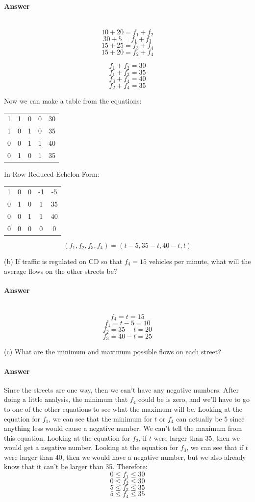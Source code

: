 \documentclass{article}
\newcommand{\p}[1]{\paragraph{#1}} %
\begin{document}
\p{Answer} \mbox{} \\
\[ 10 + 20 = f_1 + f_2 \]
\[ 30 + 5 = f_1 + f_3 \]
\[ 15 + 25 = f_3 + f_4 \]
\[ 15 + 20 = f_2 + f_4 \]

\[ f_1 + f_2 = 30 \]
\[ f_1 + f_3 = 35 \]
\[ f_3 + f_4 = 40 \]
\[ f_2 + f_4 = 35 \]

Now we can make a table from the equations:

\begin{center}
\begin{tabular}{ c c c c | c }
	1 & 1 & 0 & 0 & 30 \\
	1 & 0 & 1 & 0 & 35 \\
	0 & 0 & 1 & 1 & 40 \\
	0 & 1 & 0 & 1 & 35 \\
\end{tabular}
\end{center}

In Row Reduced Echelon Form: 

\begin{center}
\begin{tabular}{ c c c c | c }
	1 & 0 & 0 & -1 & -5 \\
	0 & 1 & 0 & 1 & 35 \\
	0 & 0 & 1 & 1 & 40 \\
	0 & 0 & 0 & 0 & 0 \\
\end{tabular}
\end{center}

\[ (f_1,f_2,f_3,f_4) = (t-5,35-t,40-t,t) \]

(b) If traffic is regulated on CD so that $f_4 = 15$ vehicles per minute, what will the average flows on the other streets be? 

\p{Answer} \mbox{} \\
\[ f_4 = t = 15 \]
\[ f_1 = t - 5 = 10 \]
\[ f_2 = 35 - t = 20 \]
\[ f_3 = 40 - t = 25 \]

(c) What are the minimum and maximum possible flows on each street? 

\p{Answer}
Since the streets are one way, then we can't have any negative numbers. After doing a little analysis, the minimum that $f_4$ could be is zero, and we'll have to go to one of the other equations to see what the maximum will be. Looking at the equation for $f_1$, we can see that the minimum for $t$ or $f_4$ can actually be 5 since anything less would cause a negative number. We can't tell the maximum from this equation. Looking at the equation for $f_2$, if $t$ were larger than 35, then we would get a negative number. Looking at the equation for $f_3$, we can see that if $t$ were larger than 40, then we would have a negative number, but we also already know that it can't be larger than 35. Therefore:
\[ 0 \le f_1 \le 30 \]
\[ 0 \le f_2 \le 30 \]
\[ 5 \le f_3 \le 35 \]
\[ 5 \le f_4 \le 35 \]
\end{document}
